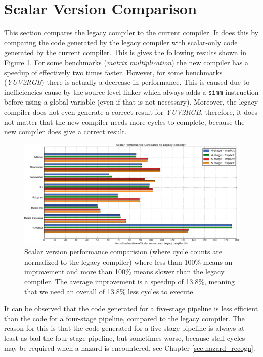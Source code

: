 \section{Scalar Version Comparison}
This section compares the legacy compiler to the current compiler. It does this by comparing the code generated by the legacy compiler with scalar-only code generated by the current compiler. This is gives the following results shown in Figure \ref{fig:legacy_scalar_cmp}. For some benchmarks (\emph{matrix multiplication}) the new compiler has a speedup of effectively two times faster. However, for some benchmarks (\emph{YUV2RGB}) there is actually a decrease in performance. This is caused due to inefficiencies cause by the source-level linker which always adds a \texttt{simm} instruction before using a global variable (even if that is not necessary). Moreover, the legacy compiler does not even generate a correct result for \emph{YUV2RGB}, therefore, it does not matter that the new compiler needs more cycles to complete, because the new compiler does give a correct result.


\begin{figure}[H]
\centering
\hspace*{-.12in}
\includegraphics[width=\textwidth]{figures/stats/scalar_cycles}
\caption{Scalar version performance comparision (where cycle counts are normalized to the legacy compiler) where less than 100\% means an improvement and more than 100\% means slower than the legacy compiler. The average improvement is a speedup of 13.8\%, meaning that we need an overall of 13.8\% less cycles to execute.}
\label{fig:legacy_scalar_cmp}
\end{figure}

It can be observed that the code generated for a five-stage pipeline is less efficient than the code for a four-stage pipeline, compared to the legacy compiler. The reason for this is that the code generated for a five-stage pipeline is always at least as bad the four-stage pipeline, but sometimes worse, because stall cycles may be required when a hazard is encountered, see Chapter \ref{sec:hazard_recogn}. 

